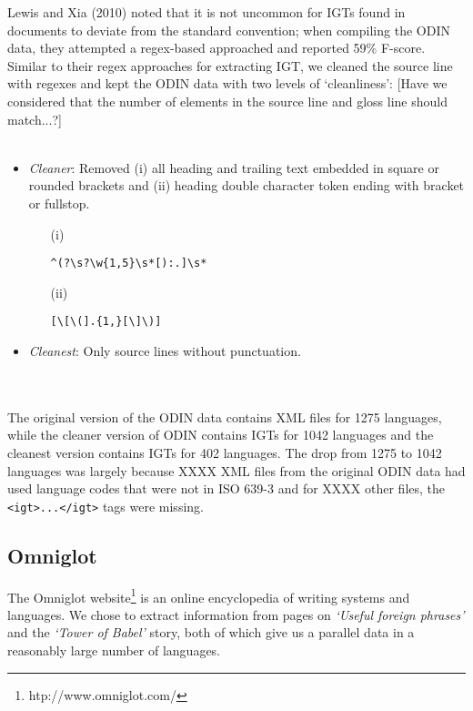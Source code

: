 \documentclass[11pt]{article}
\begin{document}
Lewis and Xia (2010) noted that it is not uncommon for IGTs found in documents to deviate from the standard convention; when compiling the ODIN data, they attempted a regex-based approached and reported 59\% F-score. Similar to their regex approaches for extracting IGT, we cleaned the source line with regexes and kept the ODIN data with two levels of `cleanliness': [Have we considered that the number of elements in the source line and gloss line should match...?]
\\ \\
\begin{minipage}{\columnwidth}
\begin{itemize}
\item \emph{Cleaner}: Removed (i) all heading and trailing text embedded in square or rounded brackets and (ii) heading double character token ending with bracket or fullstop.
\begin{itemize}
\item[(i)]
\begin{Verbatim}
^(?\s?\w{1,5}\s*[):.]\s*
\end{Verbatim}
\item[(ii)] 
\begin{Verbatim}
[\[\(].{1,}[\]\)]
\end{Verbatim}
\end{itemize}
\item \emph{Cleanest}: Only source lines without punctuation.
\end{itemize}
\end{minipage}
\\ \\

\noindent The original version of the ODIN data contains XML files for 1275 languages, while the cleaner version of ODIN contains IGTs for 1042 languages and the cleanest version contains IGTs for 402 languages. The drop from 1275 to 1042 languages was largely because {\color{red} XXXX} XML files from the original ODIN data had used language codes that were not in ISO 639-3 and for {\color{red} XXXX} other files, the \texttt{<igt>...</igt>} tags were missing. 

\subsection{Omniglot}

The Omniglot website\footnote{htp://www.omniglot.com/} is an online encyclopedia of writing systems and languages. We chose to extract information from pages on \emph{`Useful foreign phrases'} and the \emph{`Tower of Babel'} story, both of which give us a parallel data in a reasonably large number of languages.
\end{document}
